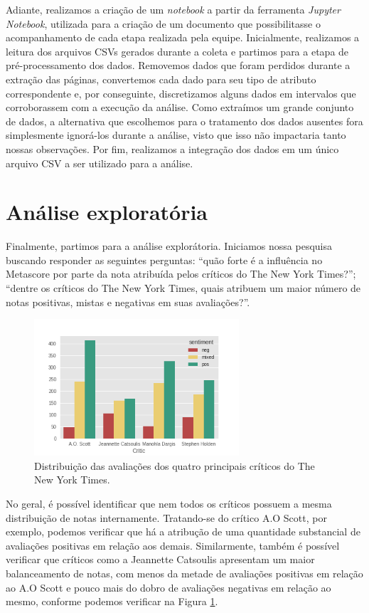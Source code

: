 \documentclass[review]{elsarticle}
\begin{document}
Adiante, realizamos a criação de um \textit{notebook} a partir da ferramenta \textit{Jupyter Notebook}, utilizada para a criação de um documento que possibilitasse o acompanhamento de cada etapa realizada pela equipe. Inicialmente, realizamos a leitura dos arquivos CSVs gerados durante a coleta e partimos para a etapa de pré-processamento dos dados. Removemos dados que foram perdidos durante a extração das páginas, convertemos cada dado para seu tipo de atributo correspondente e, por conseguinte, discretizamos alguns dados em intervalos que corroborassem com a execução da análise. Como extraímos um grande conjunto de dados, a alternativa que escolhemos para o tratamento dos dados ausentes fora simplesmente ignorá-los durante a análise, visto que isso não impactaria tanto nossas observações. Por fim, realizamos a integração dos dados em um único arquivo CSV a ser utilizado para a análise.

\section{Análise exploratória}

Finalmente, partimos para a análise explorátoria. Iniciamos nossa pesquisa buscando responder as seguintes perguntas: “quão forte é a influência no Metascore por parte da nota atribuída pelos críticos do The New York Times?”; “dentre os críticos do The New York Times, quais atribuem um maior número de notas positivas, mistas e negativas em suas avaliações?”.

\begin{figure}[!ht]
  \centering
  \includegraphics[width=288px]{../observations/sentiment-per-critics.png}
  \caption{Distribuição das avaliações dos quatro principais críticos do The New York Times.}
  \label{fig:sentPerCritic}
\end{figure}

No geral, é possível identificar que nem todos os críticos possuem a mesma distribuição de notas internamente. Tratando-se do crítico A.O Scott, por exemplo, podemos verificar que há a atribução de uma quantidade substancial de avaliações positivas em relação aos demais. Similarmente, também é possível verificar que críticos como a Jeannette Catsoulis apresentam um maior balanceamento de notas, com menos da metade de avaliações positivas em relação ao A.O Scott e pouco mais do dobro de avaliações negativas em relação ao mesmo, conforme podemos verificar na Figura \ref{fig:sentPerCritic}. 
\end{document}
